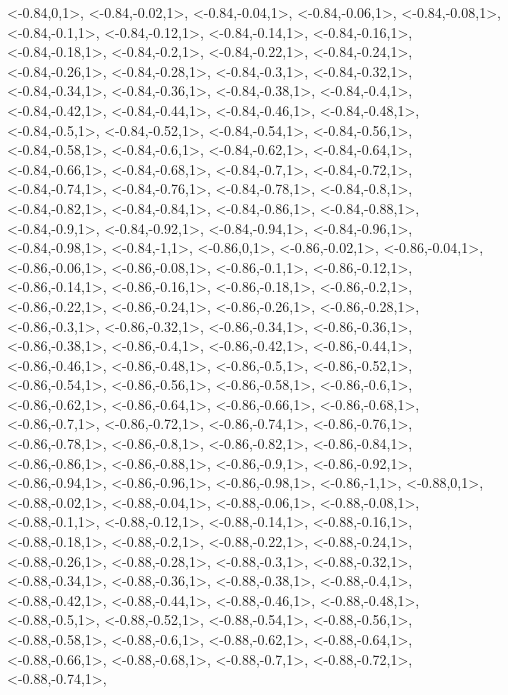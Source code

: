 \documentclass[a4paper,10pt]{article}
\begin{document}
\begin{eulernotebook}
\begin{euleroutput}
  <-0.84,0,1>,
  <-0.84,-0.02,1>,
  <-0.84,-0.04,1>,
  <-0.84,-0.06,1>,
  <-0.84,-0.08,1>,
  <-0.84,-0.1,1>,
  <-0.84,-0.12,1>,
  <-0.84,-0.14,1>,
  <-0.84,-0.16,1>,
  <-0.84,-0.18,1>,
  <-0.84,-0.2,1>,
  <-0.84,-0.22,1>,
  <-0.84,-0.24,1>,
  <-0.84,-0.26,1>,
  <-0.84,-0.28,1>,
  <-0.84,-0.3,1>,
  <-0.84,-0.32,1>,
  <-0.84,-0.34,1>,
  <-0.84,-0.36,1>,
  <-0.84,-0.38,1>,
  <-0.84,-0.4,1>,
  <-0.84,-0.42,1>,
  <-0.84,-0.44,1>,
  <-0.84,-0.46,1>,
  <-0.84,-0.48,1>,
  <-0.84,-0.5,1>,
  <-0.84,-0.52,1>,
  <-0.84,-0.54,1>,
  <-0.84,-0.56,1>,
  <-0.84,-0.58,1>,
  <-0.84,-0.6,1>,
  <-0.84,-0.62,1>,
  <-0.84,-0.64,1>,
  <-0.84,-0.66,1>,
  <-0.84,-0.68,1>,
  <-0.84,-0.7,1>,
  <-0.84,-0.72,1>,
  <-0.84,-0.74,1>,
  <-0.84,-0.76,1>,
  <-0.84,-0.78,1>,
  <-0.84,-0.8,1>,
  <-0.84,-0.82,1>,
  <-0.84,-0.84,1>,
  <-0.84,-0.86,1>,
  <-0.84,-0.88,1>,
  <-0.84,-0.9,1>,
  <-0.84,-0.92,1>,
  <-0.84,-0.94,1>,
  <-0.84,-0.96,1>,
  <-0.84,-0.98,1>,
  <-0.84,-1,1>,
  <-0.86,0,1>,
  <-0.86,-0.02,1>,
  <-0.86,-0.04,1>,
  <-0.86,-0.06,1>,
  <-0.86,-0.08,1>,
  <-0.86,-0.1,1>,
  <-0.86,-0.12,1>,
  <-0.86,-0.14,1>,
  <-0.86,-0.16,1>,
  <-0.86,-0.18,1>,
  <-0.86,-0.2,1>,
  <-0.86,-0.22,1>,
  <-0.86,-0.24,1>,
  <-0.86,-0.26,1>,
  <-0.86,-0.28,1>,
  <-0.86,-0.3,1>,
  <-0.86,-0.32,1>,
  <-0.86,-0.34,1>,
  <-0.86,-0.36,1>,
  <-0.86,-0.38,1>,
  <-0.86,-0.4,1>,
  <-0.86,-0.42,1>,
  <-0.86,-0.44,1>,
  <-0.86,-0.46,1>,
  <-0.86,-0.48,1>,
  <-0.86,-0.5,1>,
  <-0.86,-0.52,1>,
  <-0.86,-0.54,1>,
  <-0.86,-0.56,1>,
  <-0.86,-0.58,1>,
  <-0.86,-0.6,1>,
  <-0.86,-0.62,1>,
  <-0.86,-0.64,1>,
  <-0.86,-0.66,1>,
  <-0.86,-0.68,1>,
  <-0.86,-0.7,1>,
  <-0.86,-0.72,1>,
  <-0.86,-0.74,1>,
  <-0.86,-0.76,1>,
  <-0.86,-0.78,1>,
  <-0.86,-0.8,1>,
  <-0.86,-0.82,1>,
  <-0.86,-0.84,1>,
  <-0.86,-0.86,1>,
  <-0.86,-0.88,1>,
  <-0.86,-0.9,1>,
  <-0.86,-0.92,1>,
  <-0.86,-0.94,1>,
  <-0.86,-0.96,1>,
  <-0.86,-0.98,1>,
  <-0.86,-1,1>,
  <-0.88,0,1>,
  <-0.88,-0.02,1>,
  <-0.88,-0.04,1>,
  <-0.88,-0.06,1>,
  <-0.88,-0.08,1>,
  <-0.88,-0.1,1>,
  <-0.88,-0.12,1>,
  <-0.88,-0.14,1>,
  <-0.88,-0.16,1>,
  <-0.88,-0.18,1>,
  <-0.88,-0.2,1>,
  <-0.88,-0.22,1>,
  <-0.88,-0.24,1>,
  <-0.88,-0.26,1>,
  <-0.88,-0.28,1>,
  <-0.88,-0.3,1>,
  <-0.88,-0.32,1>,
  <-0.88,-0.34,1>,
  <-0.88,-0.36,1>,
  <-0.88,-0.38,1>,
  <-0.88,-0.4,1>,
  <-0.88,-0.42,1>,
  <-0.88,-0.44,1>,
  <-0.88,-0.46,1>,
  <-0.88,-0.48,1>,
  <-0.88,-0.5,1>,
  <-0.88,-0.52,1>,
  <-0.88,-0.54,1>,
  <-0.88,-0.56,1>,
  <-0.88,-0.58,1>,
  <-0.88,-0.6,1>,
  <-0.88,-0.62,1>,
  <-0.88,-0.64,1>,
  <-0.88,-0.66,1>,
  <-0.88,-0.68,1>,
  <-0.88,-0.7,1>,
  <-0.88,-0.72,1>,
  <-0.88,-0.74,1>,

\end{euleroutput}
\end{eulernotebook}
\end{document}
